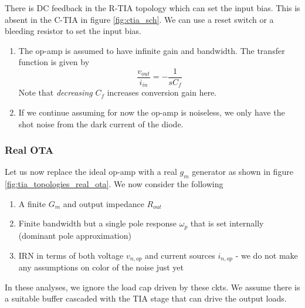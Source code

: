 \documentclass{article}
\begin{document}
There is DC feedback in the R-TIA topology which can set the input bias. This is absent in the C-TIA in figure \ref{fig:ctia_sch}. We can use a reset switch or a bleeding resistor to set the input bias. 

\begin{enumerate}
    \item The op-amp is assumed to have infinite gain and bandwidth. The transfer function is given by 
    \begin{equation}\label{eqn:ideal_ctia_tf}
        \frac{v_{out}}{i_{in}} = -\frac{1}{sC_f} 
    \end{equation}
    Note that \textit{decreasing} $C_f$ increases conversion gain here.
    \item If we continue assuming for now the op-amp is noiseless, we only have the shot noise from the dark current of the diode. 
    

\end{enumerate}




\subsubsection{Real OTA}

Let us now replace the ideal op-amp with a real $g_m$ generator as shown in figure \ref{fig:tia_topologies_real_ota}. We now consider the following

\begin{enumerate}
    \item A finite $G_m$ and output impedance $R_{out}$
    \item Finite bandwidth but a single pole response $\omega_p$ that is set internally (dominant pole approximation)
    \item IRN in terms of both voltage $v_{n,op}$ and current sources $i_{n,op}$ - we do not make any assumptions on color of the noise just yet
\end{enumerate}

In these analyses, we ignore the load cap driven by these ckts. We assume there is a suitable buffer cascaded with the TIA stage that can drive the output loads.
\end{document}
